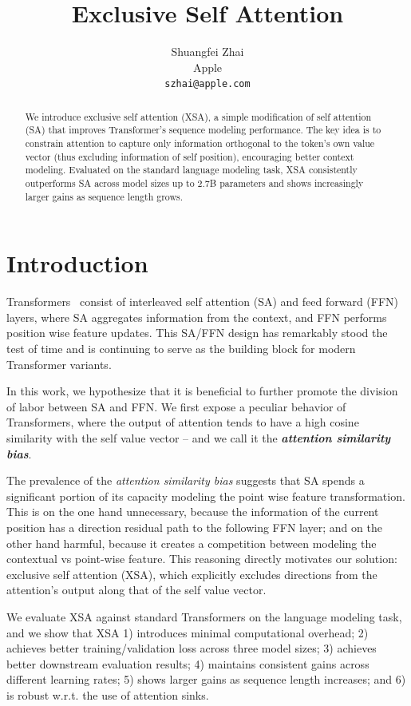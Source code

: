 \documentclass{article}
\title{Exclusive Self Attention}
\author{%
  Shuangfei Zhai\\
  Apple \\
  \texttt{szhai@apple.com} \\
}
\begin{document}
\maketitle


\begin{abstract}
We introduce exclusive self attention (XSA), a simple modification of self attention (SA) that improves Transformer's sequence modeling performance. The key idea is to constrain attention to capture only information orthogonal to the token's own value vector (thus excluding information of self position), encouraging better context modeling. Evaluated on the standard language modeling task, XSA consistently outperforms SA across model sizes up to 2.7B parameters and shows increasingly larger gains as sequence length grows.
\end{abstract}

\section{Introduction}
Transformers~\citep{vaswani2017attention} consist of interleaved self attention (SA) and feed forward (FFN) layers, where SA aggregates information from the context, and FFN performs position wise feature updates. This SA/FFN design has remarkably stood the test of time and is continuing to serve as the building block for modern Transformer variants. 

In this work, we hypothesize that it is beneficial to further promote the division of labor between SA and FFN. We first expose a peculiar behavior of Transformers, where the output of attention tends to have a high cosine similarity with the self value vector -- and we call it the \textit{\textbf{attention similarity bias}}.

The prevalence of the \textit{attention similarity bias} suggests that SA spends a significant portion of its capacity modeling the point wise feature transformation. This is on the one hand unnecessary, because the information of the current position has a direction residual path to the following FFN layer; and on the other hand harmful, because it creates a competition between modeling the contextual vs point-wise feature. This reasoning directly motivates our solution: exclusive self attention (XSA), which explicitly excludes directions from the attention's output along that of the self value vector. 

We evaluate XSA against standard Transformers on the language modeling task, and we show that XSA 1) introduces minimal computational overhead; 2) achieves better training/validation loss across three model sizes; 3) achieves better downstream evaluation results; 4) maintains consistent gains across different learning rates; 5) shows larger gains as sequence length increases; and 6) is robust w.r.t. the use of attention sinks.
\end{document}
